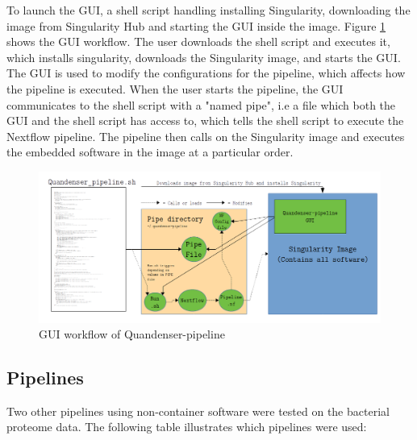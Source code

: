 To launch the GUI, a shell script handling installing Singularity, downloading the image from Singularity Hub and starting the GUI inside the image. Figure \ref{fig:GUI_workflow} shows the GUI workflow. The user downloads the shell script and executes it, which installs singularity, downloads the Singularity image, and starts the GUI. The GUI is used to modify the configurations for the pipeline, which affects how the pipeline is executed. When the user starts the pipeline, the GUI communicates to the shell script with a "named pipe", i.e a file which both the GUI and the shell script has access to, which tells the shell script to execute the Nextflow pipeline. The pipeline then calls on the Singularity image and executes the embedded software in the image at a particular order.

\begin{figure}[H]
  \includegraphics[width=\linewidth]{pictures/GUI_workflow.png}
  \caption{GUI workflow of Quandenser-pipeline}
  \label{fig:GUI_workflow}
\end{figure}

\subsection{Pipelines}

Two other pipelines using non-container software were tested on the bacterial proteome data. The following table illustrates which pipelines were used:

\newcommand{\textone}{\small The pipeline created for the thesis, using Quandenser as it's cornerstone. Due to Singularity not supporting non-POSIX systems, the Windows OS cannot run the pipeline natively without using a compatibility layer. An virtual machine wrapper was developed to allow users to run the pipeline in Windows}
\newcommand{\texttwo}{\small The custom pipeline tested on the data set was created by the workflow manager \textit{KNIME} in combination with \textit{OpenMS}, creating a custom workflow for analyzing mzML data \cite{knime} \cite{openms}. The pipeline was created by Michael Jahn at Paul Hudson's lab in SciLifeLab and was used to analyze bacterial data \cite{m-jahn-pipeline}. Both KNIME and OpenMS is available for Linux, MacOS and Windows.}
\newcommand{\textthree}{\small MaxQuant is a tool used for quantitative proteomics and is well suited for analyzing label-free proteomic data. The program can be run natively on Windows and on Linux with the framework \textit{Mono} \cite{maxquant} \cite{maxquant-installation}.}

